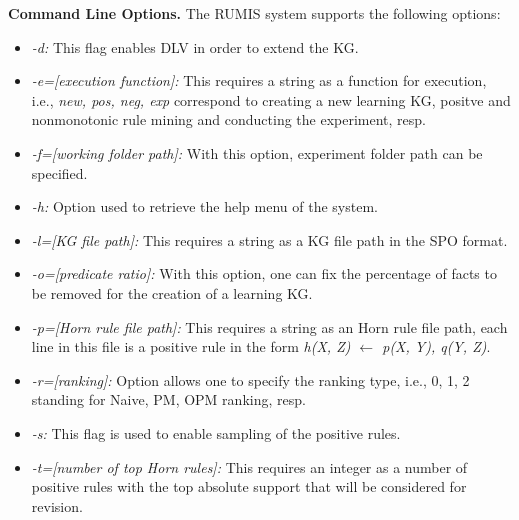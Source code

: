 %
%
%

\textbf{Command Line Options.} The RUMIS system supports the following options:

\begin{itemize}
\item \textit{-d:} This flag enables DLV in order to extend the KG.
\item \textit{-e=[execution function]:} This requires a string as a function for execution, i.e., \textit{new, pos, neg, exp} correspond to creating a new learning KG, positve and nonmonotonic rule mining and conducting the experiment, resp.
\item \textit{-f=[working folder path]:} With this option, experiment folder path can be specified.
\item \textit{-h:} Option used to retrieve the help menu of the system.
\item \textit{-l=[KG file path]:} This requires a string as a KG file path in the SPO format.
\item \textit{-o=[predicate ratio]:} With this option, one can fix the percentage of facts to be removed for the creation of a learning KG.
\item \textit{-p=[Horn rule file path]:} This requires a string as an Horn rule file path, each line in this file is a positive rule in the form \textit{h(X, Z) $\leftarrow$ p(X, Y), q(Y, Z)}.
\item \textit{-r=[ranking]:} Option allows one to specify the ranking type, i.e., 0, 1, 2 standing for Naive, PM, OPM ranking, resp.
\item \textit{-s:} This flag is used to enable sampling of the positive rules.
\item \textit{-t=[number of top Horn rules]:} This requires an integer as a number of positive rules with the top absolute support that will be considered for revision.
\end{itemize}

